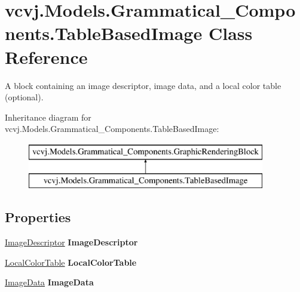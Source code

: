 \hypertarget{classvcvj_1_1_models_1_1_grammatical___components_1_1_table_based_image}{}\section{vcvj.\+Models.\+Grammatical\+\_\+\+Components.\+Table\+Based\+Image Class Reference}
\label{classvcvj_1_1_models_1_1_grammatical___components_1_1_table_based_image}


A block containing an image descriptor, image data, and a local color table (optional).  


Inheritance diagram for vcvj.\+Models.\+Grammatical\+\_\+\+Components.\+Table\+Based\+Image\+:\begin{figure}[H]
\begin{center}
\leavevmode
\includegraphics[height=2.000000cm]{classvcvj_1_1_models_1_1_grammatical___components_1_1_table_based_image}
\end{center}
\end{figure}
\subsection*{Properties}
\begin{DoxyCompactItemize}
\item 
\hyperlink{classvcvj_1_1_models_1_1_grammatical___subcomponents_1_1_image_descriptor}{Image\+Descriptor} {\bfseries Image\+Descriptor}\hypertarget{classvcvj_1_1_models_1_1_grammatical___components_1_1_table_based_image_a9740ca8aa4e9541c58e1e57a3a044334}{}\label{classvcvj_1_1_models_1_1_grammatical___components_1_1_table_based_image_a9740ca8aa4e9541c58e1e57a3a044334}

\item 
\hyperlink{classvcvj_1_1_models_1_1_grammatical___subcomponents_1_1_local_color_table}{Local\+Color\+Table} {\bfseries Local\+Color\+Table}\hypertarget{classvcvj_1_1_models_1_1_grammatical___components_1_1_table_based_image_a859e4ff577588d8e15242fb4e7b12769}{}\label{classvcvj_1_1_models_1_1_grammatical___components_1_1_table_based_image_a859e4ff577588d8e15242fb4e7b12769}

\item 
\hyperlink{classvcvj_1_1_models_1_1_grammatical___subcomponents_1_1_image_data}{Image\+Data} {\bfseries Image\+Data}\hypertarget{classvcvj_1_1_models_1_1_grammatical___components_1_1_table_based_image_ab96897d307dfe65b8c53cbf4bfb4cb64}{}\label{classvcvj_1_1_models_1_1_grammatical___components_1_1_table_based_image_ab96897d307dfe65b8c53cbf4bfb4cb64}

\end{DoxyCompactItemize}
